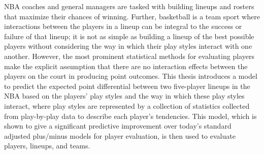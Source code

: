 
NBA coaches and general managers are tasked with building lineups and rosters that
maximize their chances of winning. Further, basketball is a team sport where
interactions between the players in a lineup can be integral to the success or
failure of that lineup; it is not as simple as building a lineup of the best
possible players without considering the way in which their play styles interact
with one another. However, the most prominent statistical methods for evaluating
players make the explicit assumption that there are no interaction effects between
the players on the court in producing point outcomes. This thesis introduces a model
to predict the expected point differential between two five-player lineups in the
NBA based on the players' play styles and the way in which these play styles
interact, where play styles are represented by a collection of statistics collected
from play-by-play data to describe each player's tendencies. This model, which is
shown to give a significant predictive improvement over today's standard adjusted
plus/minus models for player evaluation, is then used to evaluate players, lineups,
and teams.
